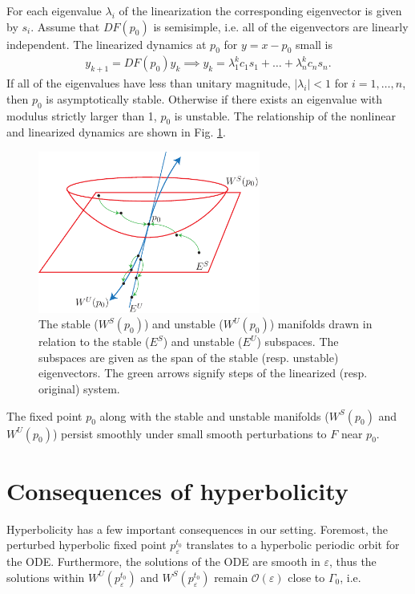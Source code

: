 For each eigenvalue $\lambda _i$ of the linearization the corresponding eigenvector is given by $s_i$. Assume that $DF(p_0)$ is semisimple, i.e. all of the eigenvectors are linearly independent. The linearized dynamics at $p_0$ for $y=x-p_0$ small is 
\begin{align}
	y_{k+1} = DF(p_0)y_k \implies y_k = \lambda_1^{k} c_1 s_1 + \ldots + \lambda_n^{k} c_n s_n.	
\end{align}
If all of the eigenvalues have less than unitary magnitude, $|\lambda _i|<1$ for $i=1,\ldots,n$, then $p_0$ is asymptotically stable. Otherwise if there exists an eigenvalue with modulus strictly larger than 1, $p_0$ is unstable. The relationship of the nonlinear and linearized dynamics are shown in Fig. \ref{fig:lin_nonlin_relation}.
\begin{figure}[h!]
	\centering
	\includegraphics[width=0.65\textwidth]{figures/ch6/9lin_nonlin_relationship.pdf}
	\caption{The stable ($W^{S}(p_0)$) and unstable ($W^{U}(p_0)$) manifolds drawn in relation to the stable ($E^{S}$) and unstable ($E^{U}$) subspaces. The subspaces are given as the span of the stable (resp. unstable) eigenvectors. The green arrows signify steps of the linearized (resp. original) system.}
	\label{fig:lin_nonlin_relation}
\end{figure}

The fixed point $p_0$ along with the stable and unstable manifolds ($W^{S}(p_0)$ and $W^{U}(p_0)$) persist smoothly under small smooth perturbations to $F$ near $p_0$.

\section{Consequences of hyperbolicity}
Hyperbolicity has a few important consequences in our setting. Foremost, the perturbed hyperbolic fixed point $p_{\varepsilon}^{t_0}$ translates to a hyperbolic periodic orbit for the ODE. Furthermore, the solutions of the ODE are smooth in $\varepsilon$, thus the solutions within $W^{U}(p_{\varepsilon}^{t_0})$ and $W^{S}(p_{\varepsilon}^{t_0})$ remain $\mathcal{O}(\varepsilon)$ close to $\Gamma_0$, i.e.

